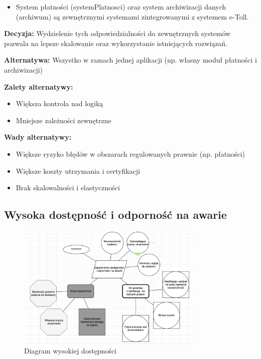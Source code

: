 \documentclass[12pt]{article}
\begin{document}
\begin{itemize}
\item System płatności (systemPlatnosci) oraz system archiwizacji danych (archiwum) są zewnętrznymi systemami zintegrowanymi z systemem e-Toll.
\end{itemize}

\textbf{Decyzja:} Wydzielenie tych odpowiedzialności do zewnętrznych systemów pozwala na lepsze skalowanie oraz wykorzystanie istniejących rozwiązań.

\textbf{Alternatywa:} Wszystko w ramach jednej aplikacji (np. własny moduł płatności i archiwizacji)

\textbf{Zalety alternatywy:}
\begin{itemize}
\item Większa kontrola nad logiką
\item Mniejsze zależności zewnętrzne
\end{itemize}

\textbf{Wady alternatywy:}
\begin{itemize}
\item Większe ryzyko błędów w obszarach regulowanych prawnie (np. płatności)
\item Większe koszty utrzymania i certyfikacji
\item Brak skalowalności i elastyczności
\end{itemize}

\subsection{Wysoka dostępność i odporność na awarie}
\begin{figure}[h]
\centering
\includegraphics[width=0.8\textwidth]{zapewnienie_dosepnosci_i_odpornosci_na_awarie.png}
\caption{Diagram wysokiej dostępności}
\label{fig:high-availability}
\end{figure}
\end{document}
